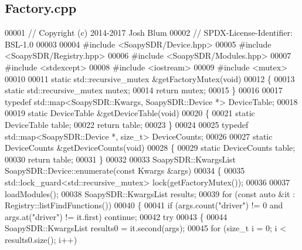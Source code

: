 \subsection{Factory.\+cpp}
\label{Factory_8cpp_source}

\begin{DoxyCode}
00001 \textcolor{comment}{// Copyright (c) 2014-2017 Josh Blum}
00002 \textcolor{comment}{// SPDX-License-Identifier: BSL-1.0}
00003 
00004 \textcolor{preprocessor}{#include <SoapySDR/Device.hpp>}
00005 \textcolor{preprocessor}{#include <SoapySDR/Registry.hpp>}
00006 \textcolor{preprocessor}{#include <SoapySDR/Modules.hpp>}
00007 \textcolor{preprocessor}{#include <stdexcept>}
00008 \textcolor{preprocessor}{#include <iostream>}
00009 \textcolor{preprocessor}{#include <mutex>}
00010 
00011 \textcolor{keyword}{static} std::recursive\_mutex &getFactoryMutex(\textcolor{keywordtype}{void})
00012 \{
00013     \textcolor{keyword}{static} std::recursive\_mutex mutex;
00014     \textcolor{keywordflow}{return} mutex;
00015 \}
00016 
00017 \textcolor{keyword}{typedef} std::map<SoapySDR::Kwargs, SoapySDR::Device *> DeviceTable;
00018 
00019 \textcolor{keyword}{static} DeviceTable &getDeviceTable(\textcolor{keywordtype}{void})
00020 \{
00021     \textcolor{keyword}{static} DeviceTable table;
00022     \textcolor{keywordflow}{return} table;
00023 \}
00024 
00025 \textcolor{keyword}{typedef} std::map<SoapySDR::Device *, size\_t> DeviceCounts;
00026 
00027 \textcolor{keyword}{static} DeviceCounts &getDeviceCounts(\textcolor{keywordtype}{void})
00028 \{
00029     \textcolor{keyword}{static} DeviceCounts table;
00030     \textcolor{keywordflow}{return} table;
00031 \}
00032 
00033 SoapySDR::KwargsList SoapySDR::Device::enumerate(\textcolor{keyword}{const} Kwargs &args)
00034 \{
00035     std::lock\_guard<std::recursive\_mutex> lock(getFactoryMutex());
00036 
00037     loadModules();
00038     SoapySDR::KwargsList results;
00039     \textcolor{keywordflow}{for} (\textcolor{keyword}{const} \textcolor{keyword}{auto} &it : Registry::listFindFunctions())
00040     \{
00041         \textcolor{keywordflow}{if} (args.count(\textcolor{stringliteral}{"driver"}) != 0 and args.at(\textcolor{stringliteral}{"driver"}) != it.first) \textcolor{keywordflow}{continue};
00042         \textcolor{keywordflow}{try}
00043         \{
00044             SoapySDR::KwargsList results0 = it.second(args);
00045             \textcolor{keywordflow}{for} (\textcolor{keywordtype}{size\_t} i = 0; i < results0.size(); i++)

\end{DoxyCode}
